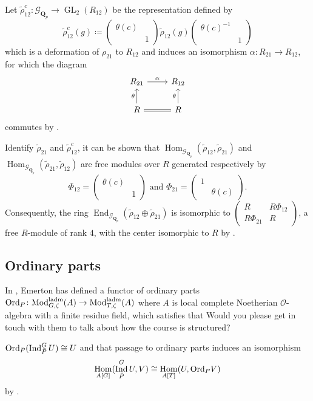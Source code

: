 \documentclass[leqno]{amsart}
\newcommand{\smat}[1]{\left( \begin{smallmatrix} #1 \end{smallmatrix} \right)}
\newcommand{\Gp}{\mathcal{G}_{\Qp}} %
\newcommand{\laMod}{\textnormal{Mod}^{\textnormal{ladm}}}
\newcommand{\Ord}{\textnormal{Ord}}
\DeclareMathOperator{\GL}{GL}
\newcommand{\Qp}{\mathbf{Q}_p}
\newcommand{\oo}{\mathcal O}
\newcommand{\1}{\mathbf{1}}
\DeclareMathOperator{\End}{End}
\DeclareMathOperator{\Hom}{Hom}
\DeclareMathOperator{\Ind}{Ind}
\theoremstyle{definition}
\theoremstyle{remark}
\begin{document}
Let $\tilde{\rho}_{12}^c\colon \Gp\to \GL_2(R_{12})$ be the representation defined by
\[
	\tilde{\rho}_{12}^c(g)\coloneqq 
	\smat{\theta(c)&\\&1}
	\tilde{\rho}_{12}(g)
	\smat{\theta(c)^{-1}&\\&1}
\]
which is a deformation of $\rho_{21}$ to $R_{12}$
and induces an isomorphism $\alpha\colon R_{21}\to R_{12}$,
for which the diagram
\[
	\begin{tikzcd}
		R_{21} \arrow[r,"\alpha"] &
		R_{12}\\
		R \arrow[u,"\theta"] \arrow[r,equal] &
		R \arrow[u,"\theta"]
	\end{tikzcd}
\]
commutes by \cite[Prop B.24]{pask}.

Identify $\tilde{\rho}_{21}$ and $\tilde{\rho}_{12}^c$,
it can be shown that 
$\Hom_{\Gp}(\tilde{\rho}_{12}, \tilde{\rho}_{21})$ and
$\Hom_{\Gp}(\tilde{\rho}_{21}, \tilde{\rho}_{12})$
are free modules over $R$ generated respectively by
\[
	\Phi_{12}=\smat{\theta(c)&\\&1} \text{ and }
	\Phi_{21}=\smat{1&\\&\theta(c)}.
\]
Consequently, the ring $\End_{\Gp}(\tilde{\rho}_{12}\oplus \tilde{\rho}_{21})$
is isomorphic to 
$\smat{R& R\Phi_{12}\\ R\Phi_{21}& R}$,
a free $R$-module of rank  $4$,
with the center isomorphic to  $R$
by \cite[Prop B.26]{pask}.

\subsection{Ordinary parts}


In \cite{eme},
Emerton has defined a functor of ordinary parts
$\Ord_P\colon \laMod_{G,\zeta}(A)\to \laMod_{T,\zeta}(A)$
where $A$ is local complete Noetherian  $\oo$-algebra
with a finite residue field,
which satisfies that
Would you please get in touch with them to talk about how the course is structured?

$\Ord_P(\Ind_{\bar{P}}^GU)\cong U$
and that passage to ordinary parts
induces an isomorphism
\begin{equation}\label{eq:adj}
	\Hom_{A[G]}(\Ind_{\bar{P}}^GU,V)\cong
	\Hom_{A[T]}(U,\Ord_PV)
\end{equation}
by \cite[Thm 4.4.6]{eme}.
\end{document}
